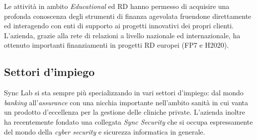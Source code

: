 Le attività in ambito \textit{Educational} ed RD hanno permesso di acquisire una profonda
conoscenza degli strumenti di finanza agevolata fruendone direttamente ed interagendo
con enti di supporto ai progetti innovativi dei propri clienti. L'azienda, grazie alla rete
di relazioni a livello nazionale ed internazionale, ha ottenuto importanti finanziamenti
in progetti RD europei (FP7 e H2020).

\subsection{Settori d'impiego}

Sync Lab si sta sempre più specializzando in vari settori d'impiego: dal mondo \textit{banking}
all'\textit{assurance} con una nicchia importante nell'ambito sanità in cui vanta un prodotto
d'eccellenza per la gestione delle cliniche private.
L'azienda inoltre ha recentemente fondato una collegata \textit{Sync Security} che si occupa
espressamente del mondo della \textit{cyber security} e sicurezza informatica in generale.

